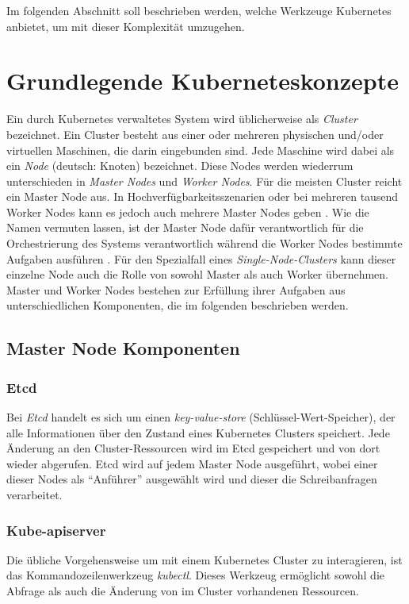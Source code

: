 \documentclass[11pt,a4paper]{article}
\begin{document}
Im folgenden Abschnitt soll beschrieben werden, welche Werkzeuge Kubernetes anbietet, um mit dieser Komplexität umzugehen.

\section{Grundlegende Kuberneteskonzepte}
Ein durch Kubernetes verwaltetes System wird üblicherweise als \emph{Cluster} bezeichnet.
Ein Cluster besteht aus einer oder mehreren physischen und/oder virtuellen Maschinen, die darin eingebunden sind.
Jede Maschine wird dabei als ein \emph{Node} (deutsch: Knoten) bezeichnet. Diese Nodes werden wiederrum unterschieden in 
\emph{Master Nodes} und \emph{Worker Nodes}.
Für die meisten Cluster reicht ein Master Node aus. In Hochverfügbarkeitsszenarien oder bei mehreren
tausend Worker Nodes kann es jedoch auch mehrere Master Nodes geben \cite{Schmeling_Dargatz_2022}.
Wie die Namen vermuten lassen, ist der Master Node dafür verantwortlich für die Orchestrierung
des Systems verantwortlich während die Worker Nodes bestimmte Aufgaben ausführen \cite{Bentaleb_Belloum_Sebaa_El-Maouhab_2021}.
Für den Spezialfall eines \emph{Single-Node-Clusters} kann dieser einzelne Node auch die Rolle von sowohl
Master als auch Worker übernehmen.
Master und Worker Nodes bestehen zur Erfüllung ihrer Aufgaben aus unterschiedlichen Komponenten,
die im folgenden beschrieben werden.

\subsection{Master Node Komponenten}
\subsubsection{Etcd}
Bei \emph{Etcd} handelt es sich um einen \emph{key-value-store} (Schlüssel-Wert-Speicher),
der alle Informationen über den Zustand eines Kubernetes Clusters speichert.
Jede Änderung an den Cluster-Ressourcen wird im Etcd gespeichert und von dort wieder abgerufen.
Etcd wird auf jedem Master Node ausgeführt, wobei einer dieser Nodes als ``Anführer'' 
ausgewählt wird und dieser die Schreibanfragen verarbeitet.

\subsubsection{Kube-apiserver}
Die übliche Vorgehensweise um mit einem Kubernetes Cluster zu interagieren, ist das Kommandozeilenwerkzeug \emph{kubectl}.
Dieses Werkzeug ermöglicht sowohl die Abfrage als auch die Änderung von im Cluster vorhandenen Ressourcen.
\end{document}
